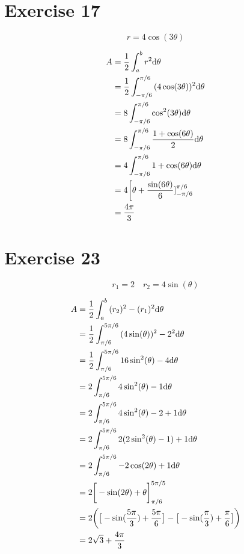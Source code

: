 \documentclass{math}
\begin{document}
\section*{Exercise 17}
\[ r = 4\cos(3\theta) \]
\begin{center}
\end{center}
\begin{align*}
  A &= \frac{1}{2}\int_{a}^{b}{r^{2}\mathrm{d}{\theta}} \\
  &= \frac{1}{2}\int_{-\pi/6}^{\pi/6}{(4\cos(3\theta))^{2}\mathrm{d}{\theta}} \\
  &= 8\int_{-\pi/6}^{\pi/6}{\cos^{2}(3\theta)\mathrm{d}{\theta}} \\
  &= 8\int_{-\pi/6}^{\pi/6}{\frac{1+\cos(6\theta)}{2}\mathrm{d}{\theta}} \\
  &= 4\int_{-\pi/6}^{\pi/6}{1+\cos(6\theta)\mathrm{d}{\theta}} \\
  &= 4\bigg[\theta+\frac{\sin(6\theta)}{6}]_{-\pi/6}^{\pi/6} \\
  &= \frac{4\pi}{3}
\end{align*}

\section*{Exercise 23}
\[ r_{1} = 2 \quad r_{2} = 4\sin(\theta) \]
\begin{center}
\end{center}
\begin{align*}
  A &= \frac{1}{2}\int_{a}^{b}{(r_{2})^{2}-(r_{1})^{2}\mathrm{d}{\theta}} \\
  &= \frac{1}{2}\int_{\pi/6}^{5\pi/6}{(4\sin(\theta))^{2}-2^{2}\mathrm{d}{\theta}} \\
  &= \frac{1}{2}\int_{\pi/6}^{5\pi/6}{16\sin^{2}(\theta)-4\mathrm{d}{\theta}} \\
  &= 2\int_{\pi/6}^{5\pi/6}{4\sin^{2}(\theta)-1\mathrm{d}{\theta}} \\
  &= 2\int_{\pi/6}^{5\pi/6}{4\sin^{2}(\theta)-2+1\mathrm{d}{\theta}} \\
  &= 2\int_{\pi/6}^{5\pi/6}{2(2\sin^{2}(\theta)-1)+1\mathrm{d}{\theta}} \\
  &= 2\int_{\pi/6}^{5\pi/6}{-2\cos(2\theta)+1\mathrm{d}{\theta}} \\
  &= 2\bigg[-\sin(2\theta)+\theta\bigg]_{\pi/6}^{5\pi/5} \\
  &= 2\bigg(\big[-\sin(\frac{5\pi}{3})+\frac{5\pi}{6}\big]-
    \big[-\sin(\frac{\pi}{3})+\frac{\pi}{6}\big]\bigg) \\
  &= 2\sqrt{3}+\frac{4\pi}{3}
\end{align*}
\end{document}
